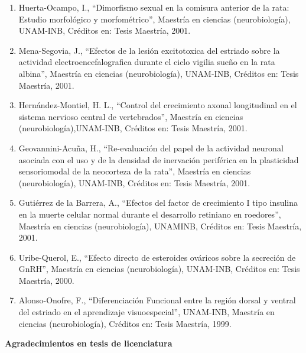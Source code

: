 \documentclass[12pt]{article}
\begin{document}
\begin{enumerate}
\item Huerta-Ocampo, I., “Dimorfismo sexual en la comisura anterior de la rata: Estudio morfológico y morfométrico”, Maestría en 
ciencias 
(neurobiología), UNAM-INB, Créditos en: Tesis Maestría, 2001.

\item Mena-Segovia, J., “Efectos de la lesión excitotoxica del estriado sobre la actividad electroencefalografica durante el ciclo 
vigilia sueño en la rata albina”, Maestría en ciencias (neurobiología), UNAM-INB, Créditos en: Tesis Maestría, 2001.

\item Hernández-Montiel, H. L., “Control del crecimiento axonal longitudinal en el sistema nervioso central de vertebrados”, Maestría 
en 
ciencias (neurobiología),UNAM-INB, Créditos en: Tesis Maestría, 2001.

\item Geovannini-Acuña, H., “Re-evaluación del papel de la actividad neuronal asociada con el uso y de la densidad de inervación 
periférica en la plasticidad sensoriomodal de la neocorteza de la rata”, Maestría en ciencias (neurobiología), UNAM-INB, Créditos en: 
Tesis Maestría, 2001.

\item Gutiérrez de la Barrera, A., “Efectos del factor de crecimiento I tipo insulina en la muerte celular normal durante el desarrollo 
retiniano en roedores”, Maestría en ciencias (neurobiología), UNAMINB, Créditos en: Tesis Maestría, 2001.

\item Uribe-Querol, E., “Efecto directo de esteroides ováricos sobre la secreción de GnRH”, Maestría en ciencias (neurobiología), 
UNAM-INB, Créditos en: Tesis Maestría, 2000.

\item Alonso-Onofre, F., “Diferenciación Funcional entre la región dorsal y ventral del estriado en el aprendizaje visuoespecial”, 
UNAM-INB, Maestría en ciencias (neurobiología), Créditos en: Tesis Maestría, 1999.
\end{enumerate}

\textbf{Agradecimientos en tesis de licenciatura}
\end{document}
